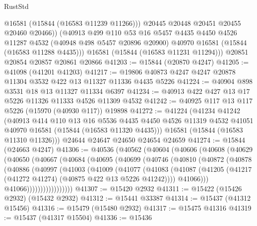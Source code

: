 \begin{lexlean}{RustStd}
\begin{coremodule}
            @16581
            (@15844 (@16583 @11239 @11266)))
          @20445
          @20448
          @20451
          @20455
          @20460
          @20466))
      (@40913
        @499
        @110
        @53
        @16
        @5457
        @4435
        @4450
        @4526
        @11287
        @4532
        (@40948 @498 @5457 @20896 @20900)
        @40970
        @16581
        (@15844 (@16583 @11288 @4435)))
      @16581
      (@15844 (@16583 @11231 @11294)))
    @20851
    @20854
    @20857
    @20861
    @20866
@41203 := @15844 (@20870 @4247)
@41205 := @41098 (@41201 @41203)
@41217 := @19806 @40873 @4247 @4247 @20878 @11304 @3532 @422 @13 @11327 @11336 @4435 @5226
@41224 := @40904 @898 @3531 @18 @13 @11327 @11334 @6397
@41234 := @40913 @422 @427 @13 @17 @5226 @11326 @11333 @4526 @11309 @4532
@41242 := @40925 @117 @13 @117 @5226 (@15970 (@40930 @117)) @19898
@41272 := @41224
    (@41234
      @41242
      (@40913
        @414
        @110
        @13
        @16
        @5536
        @4435
        @4450
        @4526
        @11319
        @4532
        @41051
        @40970
        @16581
        (@15844 (@16583 @11320 @4435)))
      @16581
      (@15844 (@16583 @11310 @11326)))
    @24644
    @24647
    @24650
    @24654
    @24659
@41274 := @15844 (@24663 @4247)
@41306 := @40536
    (@40562
      (@40604
        (@40606
          (@40608
            (@40629
              (@40650
                (@40667
                  (@40684
                    (@40695
                      (@40699
                        (@40746
                          (@40810
                            (@40872
                              (@40878
                                (@40886
                                  (@40997
                                    (@41003
                                      (@41009
                                        (@41077
                                          (@41083
                                            (@41087
                                              (@41205
                                                (@41217
                                                  (@41272 @41274)
                                                  (@40875 @422 @13 @5226 @41242))))
                                            @41066)))
                                      @41066)))))))))))))))))
@41307 := @15420 @2932
@41311 := @15422 (@15426 @2932) (@15432 @2932)
@41312 := @15441 @33387
@41314 := @15437 (@41312 @15456)
@41316 := @15479 (@15480 @2932)
@41317 := @15475 @41316
@41319 := @15437 (@41317 @15504)
@41336 := @15436

\end{coremodule}
\end{lexlean}
